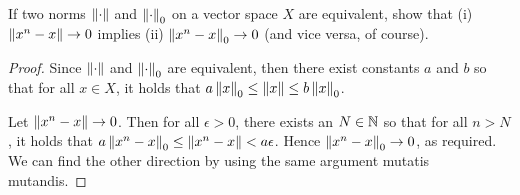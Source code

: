 \begin{exercise}{9}
If two norms $\left\lVert \cdot\right\rVert$ and $\left\lVert \cdot\right\rVert_0$ on a vector space $X$ are equivalent, show that (i) $\left\lVert x^n-x\right\rVert\to 0$ implies (ii) $\left\lVert x^n-x\right\rVert_0\to 0$ (and vice versa, of course).
\end{exercise}
\begin{proof}
Since $\left\lVert \cdot\right\rVert$ and $\left\lVert \cdot\right\rVert_0$ are equivalent, then there exist constants $a$ and $b$ so that for all $x\in X$, it holds that $a\left\lVert x\right\rVert_0 \leq\left\lVert x\right\rVert \leq b\left\lVert x\right\rVert_0$.

Let $\left\lVert x^n-x\right\rVert\to 0$. Then for all $\epsilon>0$, there exists an $N\in\mathbb{N}$ so that for all $n>N$, it holds that $a\left\lVert x^n-x\right\rVert_0 \leq\left\lVert x^n-x\right\rVert <a\epsilon$. Hence $\left\lVert x^n-x\right\rVert_0\to 0$, as required. We can find the other direction by using the same argument mutatis mutandis.
\end{proof}